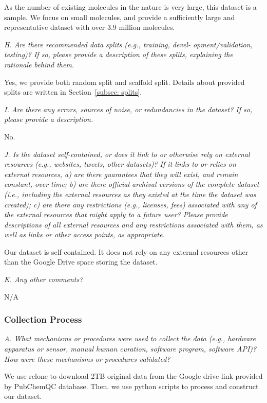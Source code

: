 \documentclass{article}
\begin{document}
As the number of existing molecules in the nature is very large, this dataset is a sample. We focus on small molecules, and provide a sufficiently large and representative dataset with over 3.9 million molecules.

\textit{H. Are there recommended data splits (e.g., training, devel- opment/validation, testing)? If so, please provide a description of these splits, explaining the rationale behind them.}

Yes, we provide both random split and scaffold split. Details about provided splits are written in Section~\ref{subsec: splits}.

\textit{I. Are there any errors, sources of noise, or redundancies in the dataset? If so, please provide a description.}

No.

\textit{J. Is the dataset self-contained, or does it link to or otherwise rely on external resources (e.g., websites, tweets, other datasets)? If it links to or relies on external resources, a) are there guarantees that they will exist, and remain constant, over time; b) are there official archival versions of the complete dataset (i.e., including the external resources as they existed at the time the dataset was created); c) are there any restrictions (e.g., licenses, fees) associated with any of the external resources that might apply to a future user? Please provide descriptions of all external resources and any restrictions associated with them, as well as links or other access points, as appropriate.}

Our dataset is self-contained. It does not rely on any external resources other than the Google Drive space storing the dataset.

\textit{K. Any other comments?}

N/A

\subsubsection{Collection Process}

\textit{A. What mechanisms or procedures were used to collect the data (e.g., hardware apparatus or sensor, manual human curation, software program, software API)? How were these mechanisms or procedures validated?}

We use rclone to download 2TB original data from the Google drive link provided by PubChemQC database. Then. we use python scripts to process and construct our dataset. 
\end{document}
